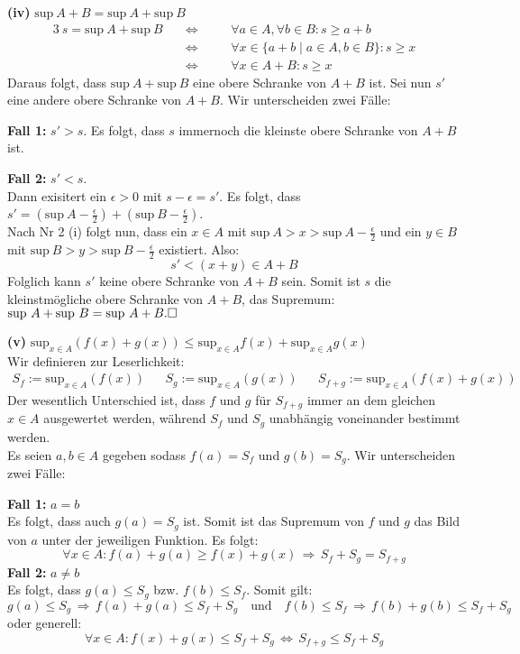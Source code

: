 \documentclass[a4paper,graphics,11pt]{article}
\begin{document}
\textbf{(iv)} $\text{sup}\ A+B = \text{sup}\ A + \text{sup}\ B$
\begin{alignat*}{3}
    \ s = \text{sup}\ A+ \text{sup}\ B \quad&\Longleftrightarrow\quad&& \forall a \in A, \forall b \in B \colon s \geq a+b\\[1pt]
    &\Longleftrightarrow&& \forall x \in \{a+b\mid a \in A, b\in B\} \colon s \geq x\\[1pt]
    &\Longleftrightarrow&& \forall x \in A+B \colon s \geq x
\end{alignat*}
Daraus folgt, dass $\text{sup}\ A + \text{sup}\ B$ eine obere Schranke von $A+B$ ist.
Sei nun $s'$ eine andere obere Schranke von $A+B$. Wir unterscheiden zwei Fälle:

\textbf{Fall 1:} $s'>s$. Es folgt, dass $s$ immernoch die kleinste obere Schranke von $A+B$ ist.

\textbf{Fall 2:} $s'<s$.\\
Dann exisitert ein $\epsilon > 0$ mit $s-\epsilon = s'$.
Es folgt, dass $s' = (\text{sup}\ A -\frac{\epsilon}{2}) + (\text{sup}\ B - \frac{\epsilon}{2})$.\\
Nach Nr 2 (i) folgt nun, dass ein $x \in A$ mit
$\text{sup}\ A > x > \text{sup}\ A - \frac{\epsilon}{2}$ und ein $y \in B$ mit
$\text{sup}\ B > y > \text{sup}\ B - \frac{\epsilon}{2}$ existiert.
Also:
$$
   s'<(x+y)\in A+B
$$
Folglich kann $s'$ keine obere Schranke von $A+B$ sein.
Somit ist $s$ die kleinstmögliche obere Schranke von $A+B$, das Supremum:
$\text{sup}\ A + \text{sup}\ B = \text{sup}\ A+B.\hfill\square$

\textbf{(v)} $\text{sup}_{x\in A}(f(x)+g(x))\leq\text{sup}_{x\in A}f(x)+\text{sup}_{x\in A}g(x)$\\[5pt]
Wir definieren zur Leserlichkeit:
\begin{align*}
    S_f := \text{sup}_{x\in A}(f(x)) && S_g := \text{sup}_{x\in A}(g(x)) && S_{f+g}
    := \text{sup}_{x\in A}(f(x)+g(x))
\end{align*}
Der wesentlich Unterschied ist, dass $f$ und $g$ für $S_{f+g}$ immer an dem gleichen
$x\in A$ ausgewertet werden, während $S_f$ und $S_g$ unabhängig voneinander bestimmt werden.
\\
Es seien $a, b \in A$ gegeben sodass $f(a) = S_f$ und $g(b) = S_g$. Wir unterscheiden zwei
Fälle:

\textbf{Fall 1:} $a = b$\\
Es folgt, dass auch $g(a) = S_g$ ist. Somit ist das Supremum von $f$ und $g$ das
Bild von $a$ unter der jeweiligen Funktion. Es folgt:
$$
    \forall x \in A\colon f(a)+g(a) \geq f(x)+g(x) \,\Longrightarrow\, S_f+S_g = S_{f+g}
$$
\newpage
\textbf{Fall 2:} $a \neq b$\\
Es folgt, dass $g(a) \leq S_g$ bzw. $f(b) \leq S_f$. Somit gilt:
$$
    g(a) \leq S_g \,\Longrightarrow\, f(a)+g(a) \leq S_f+S_g\quad\text{und}\quad
    f(b) \leq S_f \,\Longrightarrow\, f(b)+g(b) \leq S_f+S_g
$$
oder generell:
$$
    \forall x\in A\colon f(x)+g(x) \leq S_f+S_g \,\Longleftrightarrow\, S_{f+g} \leq S_f+S_g
$$
\end{document}
